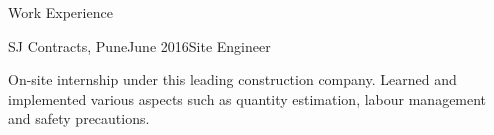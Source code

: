 \documentclass{resume} %
\begin{document}

\begin{rSection}{Work Experience}

\begin{rSubsection}{SJ Contracts, Pune}{June 2016}{Site Engineer}{}
\item On-site internship under this leading construction company. Learned and implemented various aspects such as quantity estimation, labour management and safety precautions.
\end{rSubsection}
\end{rSection}
\end{document}
